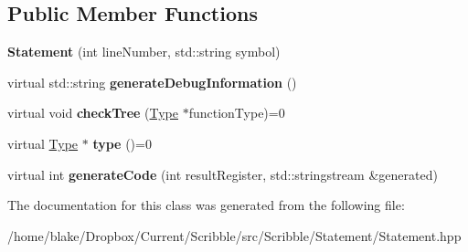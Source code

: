 \subsection*{Public Member Functions}
\begin{DoxyCompactItemize}
\item 
\hypertarget{class_scribble_core_1_1_statement_a50ba2a4800bfeabd185a6028d1636743}{{\bfseries Statement} (int line\-Number, std\-::string symbol)}\label{class_scribble_core_1_1_statement_a50ba2a4800bfeabd185a6028d1636743}

\item 
\hypertarget{class_scribble_core_1_1_statement_a6ce617dcee68fdbad33c7e84becc71c3}{virtual std\-::string {\bfseries generate\-Debug\-Information} ()}\label{class_scribble_core_1_1_statement_a6ce617dcee68fdbad33c7e84becc71c3}

\item 
\hypertarget{class_scribble_core_1_1_statement_a894e4f8d8b35279bb9ea87f20afdb978}{virtual void {\bfseries check\-Tree} (\hyperlink{class_scribble_core_1_1_type}{Type} $\ast$function\-Type)=0}\label{class_scribble_core_1_1_statement_a894e4f8d8b35279bb9ea87f20afdb978}

\item 
\hypertarget{class_scribble_core_1_1_statement_a532ed5a44ec49873dc191dae7ddc8b00}{virtual \hyperlink{class_scribble_core_1_1_type}{Type} $\ast$ {\bfseries type} ()=0}\label{class_scribble_core_1_1_statement_a532ed5a44ec49873dc191dae7ddc8b00}

\item 
\hypertarget{class_scribble_core_1_1_statement_aa3951ffef06ca195054a0bdfc8a4c8de}{virtual int {\bfseries generate\-Code} (int result\-Register, std\-::stringstream \&generated)}\label{class_scribble_core_1_1_statement_aa3951ffef06ca195054a0bdfc8a4c8de}

\end{DoxyCompactItemize}


The documentation for this class was generated from the following file\-:\begin{DoxyCompactItemize}
\item 
/home/blake/\-Dropbox/\-Current/\-Scribble/src/\-Scribble/\-Statement/Statement.\-hpp\end{DoxyCompactItemize}
